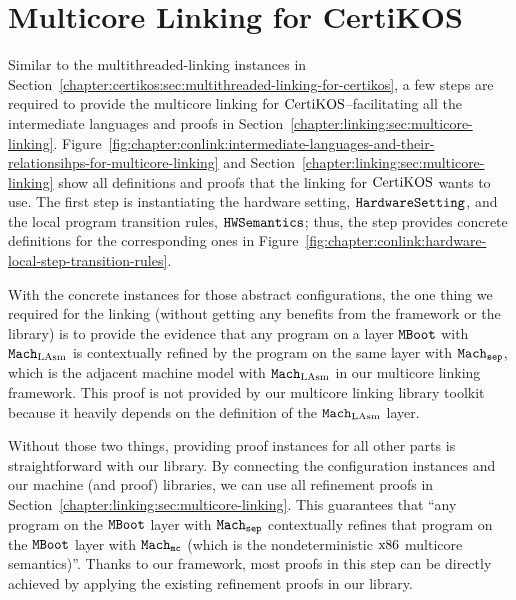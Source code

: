 \section{Multicore Linking for CertiKOS}
\label{chapter:certikos:sec:multicore-linking-for-certikos}


Similar to the multithreaded-linking instances in Section~\ref{chapter:certikos:sec:multithreaded-linking-for-certikos}, a few steps are required  to provide the multicore linking for $\mathrm{CertiKOS}$--facilitating all the intermediate languages
and proofs in Section~\ref{chapter:linking:sec:multicore-linking}.
Figure~\ref{fig:chapter:conlink:intermediate-languages-and-their-relationsihps-for-multicore-linking} and 
Section~\ref{chapter:linking:sec:multicore-linking} show all definitions and 
proofs that the linking for $\mathrm{CertiKOS}$ wants to use. 
The first step is instantiating the hardware setting, ${{\mathrm{\texttt{HardwareSetting}}}}$, and the local program transition rules, ${{\mathrm{\texttt{HWSemantics}}}}$;
thus, the step provides concrete definitions for the corresponding ones  
 in Figure~\ref{fig:chapter:conlink:hardware-local-step-transition-rules}.

With the concrete instances for those abstract configurations, 
the one thing  we required for the linking (without getting any benefits from the framework or the library)
is to provide the evidence that any program on a layer ${\mathrm{\texttt{MBoot}}}$  with ${\mathrm{\texttt{Mach}}}_{\mathrm{LAsm}}$ is contextually refined by the program on the same layer with ${{{\mathrm{\texttt{Mach}}}}_{{\mathrm{\texttt{sep}}}}}$, which is the adjacent machine model with ${\mathrm{\texttt{Mach}}}_{\mathrm{LAsm}}$ in our multicore linking framework. This proof is not provided by our multicore linking library toolkit because it heavily depends on the definition of the ${\mathrm{\texttt{Mach}}}_{\mathrm{LAsm}}$ layer.

Without those two things, providing proof instances for all other parts is straightforward with our library. 
By connecting the configuration instances and our machine (and proof) libraries, 
we can use all refinement proofs in Section~\ref{chapter:linking:sec:multicore-linking}. 
This guarantees that ``any program on the ${\mathrm{\texttt{MBoot}}}$ layer with ${{{\mathrm{\texttt{Mach}}}}_{{\mathrm{\texttt{sep}}}}}$ contextually refines that program on the ${\mathrm{\texttt{MBoot}}}$ layer with ${{{{\mathrm{\texttt{Mach}}}}_{\mathrm{\texttt{mc}}}}}$ (which is the nondeterministic $\mathrm{x86}$ multicore semantics)''.
Thanks to our framework, most proofs in this step can be directly achieved by applying the existing refinement proofs in our library.
%
